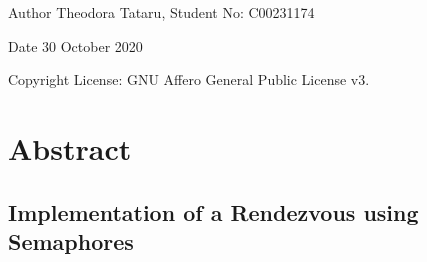 \begin{DoxyAuthor}{Author}
Theodora Tataru, Student No\+: C00231174~\newline
 
\end{DoxyAuthor}
\begin{DoxyDate}{Date}
30 October 2020 
\end{DoxyDate}
\begin{DoxyCopyright}{Copyright}
License\+: G\+NU Affero General Public License v3. 
\end{DoxyCopyright}
\hypertarget{index_Abstract}{}\section{Abstract}\label{index_Abstract}
\hypertarget{index_An}{}\subsection{Implementation of a Rendezvous using Semaphores}\label{index_An}

